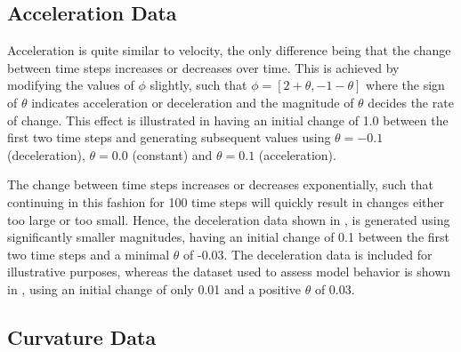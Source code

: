 \subsection{Acceleration Data}

    Acceleration is quite similar to velocity, the only difference being that the change between time steps increases or decreases over time. This is achieved by modifying the values of $\phi$ slightly, such that $\phi=[2+\theta,-1-\theta]$ where the sign of $\theta$ indicates acceleration or deceleration and the magnitude of $\theta$ decides the rate of change. This effect is illustrated in  having an initial change of 1.0 between the first two time steps and generating subsequent values using $\theta=-0.1$ (deceleration), $\theta=0.0$ (constant) and $\theta=0.1$ (acceleration).
    
    The change between time steps increases or decreases exponentially, such that continuing in this fashion for 100 time steps will quickly result in changes either too large or too small. Hence, the deceleration data shown in , is generated using significantly smaller magnitudes, having an initial change of 0.1 between the first two time steps and a minimal $\theta$ of -0.03.
    The deceleration data is included for illustrative purposes, whereas the dataset used to assess model behavior is shown in , using an initial change of only 0.01 and a positive $\theta$ of $0.03$.

\subsection{Curvature Data}

